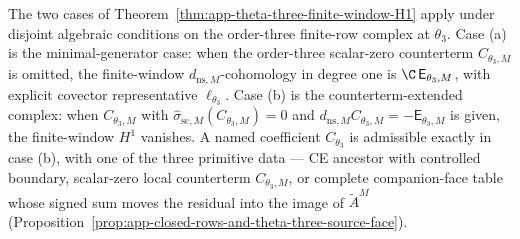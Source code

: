 \begin{rmk}
\label{rmk:app-theta-three-dichotomy-sub-theorem}
  The two cases of
  Theorem~\ref{thm:app-theta-three-finite-window-H1} apply under
  disjoint algebraic conditions on the order-three finite-row complex
  at \(\theta_3\).  Case (a) is the minimal-generator case: when the
  order-three scalar-zero counterterm
  \(C_{\theta_3,M}\) is omitted, the finite-window
  \(d_{\mathrm{ns},M}\)-cohomology in degree one is
  \(\C\,\mathsf E_{\theta_3,M}\), with explicit covector
  representative \(\ell_{\theta_3}\).  Case (b) is the
  counterterm-extended complex: when \(C_{\theta_3,M}\) with
  \(\widehat\sigma_{\mathrm{sc},M}(C_{\theta_3,M})=0\) and
  \(d_{\mathrm{ns},M}C_{\theta_3,M}=-\mathsf E_{\theta_3,M}\) is
  given, the finite-window \(H^1\) vanishes.  A named coefficient
  \(C_{\theta_3}\) is admissible exactly in case (b), with one
  of the three primitive data --- CE ancestor with controlled boundary,
  scalar-zero local counterterm \(C_{\theta_3,M}\), or complete
  companion-face table whose signed sum moves the residual into the
  image of \(\widetilde A^M\)
  (Proposition~\ref{prop:app-closed-rows-and-theta-three-source-face}).
\end{rmk}

